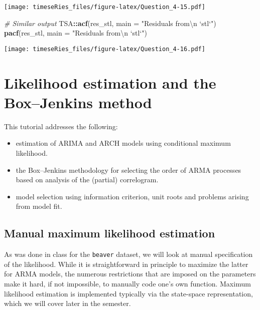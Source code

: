 \documentclass[]{book}
\newenvironment{Shaded}{\begin{snugshade}}{\end{snugshade}}
\newcommand{\KeywordTok}[1]{\textcolor[rgb]{0.13,0.29,0.53}{\textbf{#1}}}
\newcommand{\DataTypeTok}[1]{\textcolor[rgb]{0.13,0.29,0.53}{#1}}
\newcommand{\CharTok}[1]{\textcolor[rgb]{0.31,0.60,0.02}{#1}}
\newcommand{\StringTok}[1]{\textcolor[rgb]{0.31,0.60,0.02}{#1}}
\newcommand{\CommentTok}[1]{\textcolor[rgb]{0.56,0.35,0.01}{\textit{#1}}}
\newcommand{\OperatorTok}[1]{\textcolor[rgb]{0.81,0.36,0.00}{\textbf{#1}}}
\newcommand{\NormalTok}[1]{#1}
\providecommand{\tightlist}{%
  \setlength{\itemsep}{0pt}\setlength{\parskip}{0pt}}
\begin{document}
\texttt{[image: timeseRies\_files/figure-latex/Question\_4-15.pdf]}

\begin{Shaded}
\begin{Highlighting}[]
\CommentTok{# Similar output}
\NormalTok{TSA}\OperatorTok{::}\KeywordTok{acf}\NormalTok{(res_stl, }\DataTypeTok{main =} \StringTok{"Residuals from}\CharTok{\textbackslash{}n}\StringTok{ `stl`"}\NormalTok{)}
\KeywordTok{pacf}\NormalTok{(res_stl, }\DataTypeTok{main =} \StringTok{"Residuals from}\CharTok{\textbackslash{}n}\StringTok{ `stl`"}\NormalTok{)}
\end{Highlighting}
\end{Shaded}

\texttt{[image: timeseRies\_files/figure-latex/Question\_4-16.pdf]}

\chapter{Likelihood estimation and the Box--Jenkins
method}\label{likelihood-estimation-and-the-boxjenkins-method}

This tutorial addresses the following:

\begin{itemize}
\tightlist
\item
  estimation of ARIMA and ARCH models using conditional maximum
  likelihood.
\item
  the Box--Jenkins methodology for selecting the order of ARMA processes
  based on analysis of the (partial) correlogram.
\item
  model selection using information criterion, unit roots and problems
  arising from model fit.
\end{itemize}

\section{Manual maximum likelihood
estimation}\label{manual-maximum-likelihood-estimation}

As was done in class for the \texttt{beaver} dataset, we will look at
manual specification of the likelihood. While it is straightforward in
principle to maximize the latter for ARMA models, the numerous
restrictions that are imposed on the parameters make it hard, if not
impossible, to manually code one's own function. Maximum likelihood
estimation is implemented typically via the state-space representation,
which we will cover later in the semester.
\end{document}
